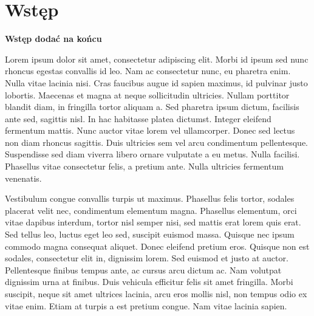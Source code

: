 \chapter*{Wstęp}

\textbf{Wstęp dodać na końcu}

 Lorem ipsum dolor sit amet, consectetur adipiscing elit. Morbi id ipsum sed nunc rhoncus egestas convallis id leo. Nam ac consectetur nunc, eu pharetra enim. Nulla vitae lacinia nisi. Cras faucibus augue id sapien maximus, id pulvinar justo lobortis. Maecenas et magna at neque sollicitudin ultricies. Nullam porttitor blandit diam, in fringilla tortor aliquam a. Sed pharetra ipsum dictum, facilisis ante sed, sagittis nisl. In hac habitasse platea dictumst. Integer eleifend fermentum mattis. Nunc auctor vitae lorem vel ullamcorper. Donec sed lectus non diam rhoncus sagittis. Duis ultricies sem vel arcu condimentum pellentesque. Suspendisse sed diam viverra libero ornare vulputate a eu metus. Nulla facilisi. Phasellus vitae consectetur felis, a pretium ante. Nulla ultricies fermentum venenatis.

Vestibulum congue convallis turpis ut maximus. Phasellus felis tortor, sodales placerat velit nec, condimentum elementum magna. Phasellus elementum, orci vitae dapibus interdum, tortor nisl semper nisi, sed mattis erat lorem quis erat. Sed tellus leo, luctus eget leo sed, suscipit euismod massa. Quisque nec ipsum commodo magna consequat aliquet. Donec eleifend pretium eros. Quisque non est sodales, consectetur elit in, dignissim lorem. Sed euismod et justo at auctor. Pellentesque finibus tempus ante, ac cursus arcu dictum ac. Nam volutpat dignissim urna at finibus. Duis vehicula efficitur felis sit amet fringilla. Morbi suscipit, neque sit amet ultrices lacinia, arcu eros mollis nisl, non tempus odio ex vitae enim. Etiam at turpis a est pretium congue. Nam vitae lacinia sapien. 